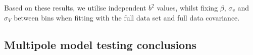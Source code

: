 \documentclass[iop,twocolappendix]{emulateapj}
\begin{document}
Based on these results, we utilise independent $b^2$ values, whilst fixing $\beta$, $\sigma_v$ and $\sigma_V$ between bins when fitting with the full data set and full data covariance.

\subsection{Multipole model testing conclusions}
\end{document}
